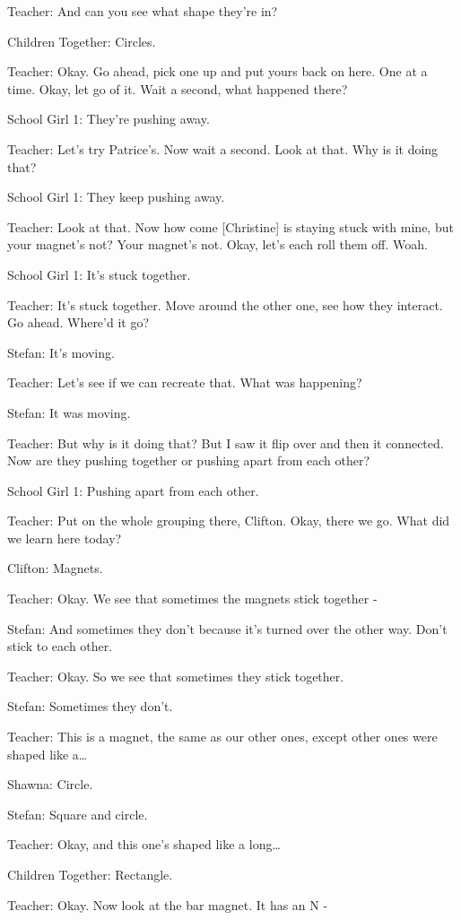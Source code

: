Teacher: And can you see what shape they're in?

Children Together: Circles.

Teacher: Okay. Go ahead, pick one up and put yours back on here. One at a time. Okay, let go of it. Wait a second, what happened there?

School Girl 1: They're pushing away.

Teacher: Let's try Patrice's. Now wait a second. Look at that. Why is it doing that?

School Girl 1: They keep pushing away.

Teacher: Look at that. Now how come [Christine] is staying stuck with mine, but your magnet's not? Your magnet's not. Okay, let's each roll them off. Woah.

School Girl 1: It's stuck together.

Teacher: It's stuck together. Move around the other one, see how they interact. Go ahead. Where'd it go?

Stefan: It's moving.

Teacher: Let's see if we can recreate that. What was happening?

Stefan: It was moving.

Teacher: But why is it doing that? But I saw it flip over and then it connected. Now are they pushing together or pushing apart from each other?

School Girl 1: Pushing apart from each other.

Teacher: Put on the whole grouping there, Clifton. Okay, there we go. What did we learn here today?

Clifton: Magnets.

Teacher: Okay. We see that sometimes the magnets stick together -

Stefan: And sometimes they don't because it's turned over the other way. Don't stick to each other.

Teacher: Okay. So we see that sometimes they stick together.

Stefan: Sometimes they don't.

Teacher: This is a magnet, the same as our other ones, except other ones were shaped like a\dots

Shawna: Circle.

Stefan: Square and circle.

Teacher: Okay, and this one's shaped like a long\dots

Children Together: Rectangle.

Teacher: Okay. Now look at the bar magnet. It has an N -


